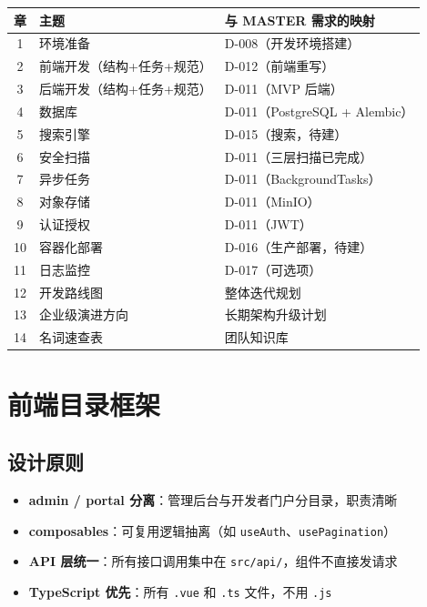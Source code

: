 \documentclass[11pt,a4paper]{article}
\begin{document}
\begin{table}[h]
\centering
\begin{tabularx}{\linewidth}{clX}
\toprule
\textbf{章} & \textbf{主题} & \textbf{与 MASTER 需求的映射} \\
\midrule
1 & 环境准备 & D-008（开发环境搭建） \\
2 & 前端开发（结构+任务+规范） & D-012（前端重写） \\
3 & 后端开发（结构+任务+规范） & D-011（MVP 后端） \\
4 & 数据库 & D-011（PostgreSQL + Alembic） \\
5 & 搜索引擎 & D-015（搜索，待建） \\
6 & 安全扫描 & D-011（三层扫描已完成） \\
7 & 异步任务 & D-011（BackgroundTasks） \\
8 & 对象存储 & D-011（MinIO） \\
9 & 认证授权 & D-011（JWT） \\
10 & 容器化部署 & D-016（生产部署，待建） \\
11 & 日志监控 & D-017（可选项） \\
12 & 开发路线图 & 整体迭代规划 \\
13 & 企业级演进方向 & 长期架构升级计划 \\
14 & 名词速查表 & 团队知识库 \\
\bottomrule
\end{tabularx}
\end{table}

\section{前端目录框架}

\subsection{设计原则}

\begin{itemize}[nosep]
  \item \textbf{admin / portal 分离}：管理后台与开发者门户分目录，职责清晰
  \item \textbf{composables}：可复用逻辑抽离（如 \texttt{useAuth}、\texttt{usePagination}）
  \item \textbf{API 层统一}：所有接口调用集中在 \texttt{src/api/}，组件不直接发请求
  \item \textbf{TypeScript 优先}：所有 \texttt{.vue} 和 \texttt{.ts} 文件，不用 \texttt{.js}
\end{itemize}
\end{document}
